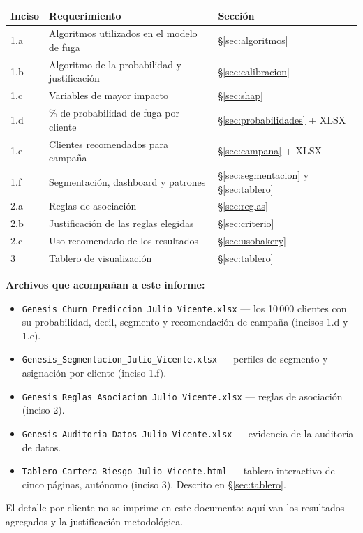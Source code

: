 \documentclass[11pt,a4paper]{article}
\begin{document}
\vspace{0.6em}
\noindent\begin{tabular}{@{}p{}p{}p{}@{}}
\toprule
\textbf{Inciso} & \textbf{Requerimiento} & \textbf{Sección} \\
\midrule
1.a & Algoritmos utilizados en el modelo de fuga & \S\ref{sec:algoritmos} \\
1.b & Algoritmo de la probabilidad y justificación & \S\ref{sec:calibracion} \\
1.c & Variables de mayor impacto & \S\ref{sec:shap} \\
1.d & \% de probabilidad de fuga por cliente & \S\ref{sec:probabilidades} + XLSX \\
1.e & Clientes recomendados para campaña & \S\ref{sec:campana} + XLSX \\
1.f & Segmentación, dashboard y patrones & \S\ref{sec:segmentacion} y \S\ref{sec:tablero} \\
2.a & Reglas de asociación & \S\ref{sec:reglas} \\
2.b & Justificación de las reglas elegidas & \S\ref{sec:criterio} \\
2.c & Uso recomendado de los resultados & \S\ref{sec:usobakery} \\
3   & Tablero de visualización & \S\ref{sec:tablero} \\
\bottomrule
\end{tabular}

\vspace{1.2em}
\begin{nota}
\small\textbf{Archivos que acompañan a este informe:}
\begin{itemize}[leftmargin=1.2em,nosep]
\item \texttt{Genesis\_Churn\_Prediccion\_Julio\_Vicente.xlsx} --- los 10\,000 clientes
      con su probabilidad, decil, segmento y recomendación de campaña (incisos 1.d y 1.e).
\item \texttt{Genesis\_Segmentacion\_Julio\_Vicente.xlsx} --- perfiles de segmento y
      asignación por cliente (inciso 1.f).
\item \texttt{Genesis\_Reglas\_Asociacion\_Julio\_Vicente.xlsx} --- reglas de asociación (inciso 2).
\item \texttt{Genesis\_Auditoria\_Datos\_Julio\_Vicente.xlsx} --- evidencia de la auditoría de datos.
\item \texttt{Tablero\_Cartera\_Riesgo\_Julio\_Vicente.html} --- tablero interactivo de
      cinco páginas, autónomo (inciso 3). Descrito en \S\ref{sec:tablero}.
\end{itemize}
El detalle por cliente no se imprime en este documento: aquí van los resultados
agregados y la justificación metodológica.
\end{nota}
\end{document}
